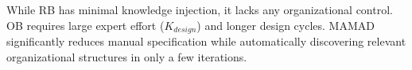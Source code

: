 \documentclass[pdflatex,sn-mathphys-num]{sn-jnl}%
\theoremstyle{thmstyleone}%
\theoremstyle{thmstyletwo}%
\theoremstyle{thmstylethree}%
\begin{document}
While RB has minimal knowledge injection, it lacks any organizational control. OB requires large expert effort ($K_{design}$) and longer design cycles. MAMAD significantly reduces manual specification while automatically discovering relevant organizational structures in only a few iterations.





\end{document}

